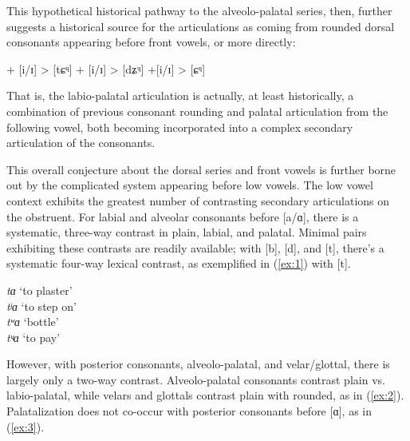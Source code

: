 \documentclass[output=paper,colorlinks,citecolor=brown]{langscibook}
\begin{document}
This hypothetical historical pathway to the alveolo-palatal series, then, further suggests a historical source for the  articulations as coming from rounded dorsal consonants appearing before front vowels, or more directly: \newline

\indent [kʷa] + [i/ɪ] > [tɕᶣ] \newline
\indent [gʷ] + [i/ɪ] > [dʑᶣ] \newline
\indent [hʷ] +[i/ɪ] > [ɕᶣ] \newline

That is, the labio-palatal articulation is actually, at least historically, a combination of previous consonant rounding and palatal articulation from the following vowel, both becoming incorporated into a complex secondary articulation of the consonants. 

This overall conjecture about the dorsal series and front vowels is further borne out by the complicated system appearing before low vowels. The low vowel context exhibits the greatest number of contrasting secondary articulations on the obstruent. For labial and alveolar consonants before [a/ɑ], there is a systematic, three-way contrast in plain, labial, and palatal. Minimal pairs exhibiting these  contrasts are readily available; with [b], [d], and [t], there’s a systematic four-way lexical contrast, as exemplified in (\ref{ex:1}) with [t]. 

\ea \label{ex:1}
\begin{xlist}
\ex \textit{tɑ} `to plaster' \\
\ex \textit{tʲɑ} `to step on' \\
\ex \textit{tʷɑ} `bottle' \\
\ex \textit{tᶣɑ} `to pay' \\
\end{xlist}
\z

However, with posterior consonants, alveolo-palatal, and velar/glottal, there is largely only a two-way contrast. Alveolo-palatal consonants contrast plain vs. labio-palatal, while velars and glottals contrast plain with rounded, as in (\ref{ex:2}). Palatalization does not co-occur with posterior consonants before [ɑ], as in (\ref{ex:3}). 

\ea \label{ex:2}
\begin{xlist}
\end{xlist}
\ex \label{ex:3}
\begin{xlist}
\end{xlist}
\z
\end{document}
